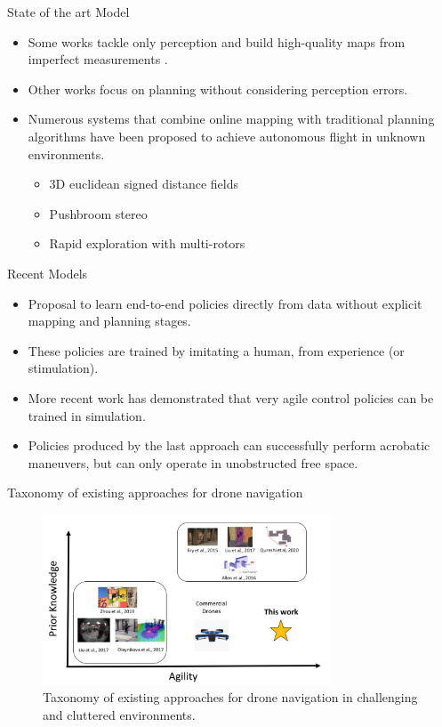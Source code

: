 \documentclass{beamer}
\begin{document}
\begin{frame}{State of the art Model}
	\begin{itemize}
		\item Some works tackle only perception and build high-quality maps from imperfect measurements \autocite{fastPlanner}. 
		\item Other works focus on planning without considering perception errors. \autocite{reactive_method}
		\item Numerous systems that combine online mapping with traditional planning algorithms have been proposed to achieve autonomous flight in unknown environments.
		\begin{itemize}
			\item 3D euclidean signed distance fields
			\item Pushbroom stereo
			\item Rapid exploration with multi-rotors
		\end{itemize} 
	\end{itemize}
\end{frame}

\begin{frame}{Recent Models}
	\begin{itemize}
		\item Proposal to learn end-to-end policies directly from data without explicit mapping and planning stages. 
		\item These policies are trained by imitating a human, from experience (or stimulation). 
		\item More recent work has demonstrated that very agile control policies can be trained in simulation. 
		\item Policies produced by the last approach can successfully perform acrobatic maneuvers, but can only operate in unobstructed free space.
	\end{itemize}
\end{frame}

\begin{frame}{Taxonomy of existing approaches for drone navigation}
	\centering
	\begin{figure}
		\includegraphics[height=2in]{taxonomy_navigation.png}
		\caption{Taxonomy of existing approaches for drone navigation in challenging and cluttered environments.}
	\end{figure}
\end{frame}
\end{document}
